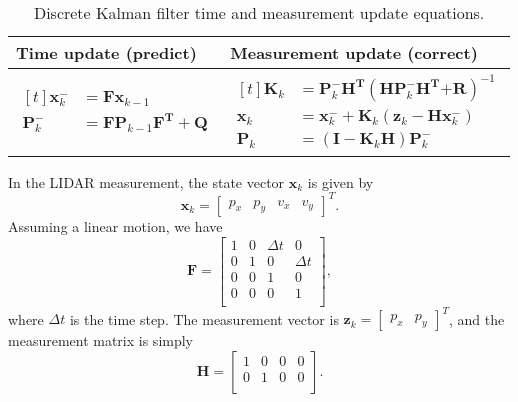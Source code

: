 \documentclass[12pt]{article}
\begin{document}
\begin{table}[h]
	\renewcommand{\arraystretch}{1.5}
	\caption{Discrete Kalman filter time and measurement update equations.}
	\centering
	\label{tab:table-KF}
	\begin{tabular}{C{7cm}|C{7cm}}
		\hline
		Time update (predict) & Measurement update (correct) \\
		\hline
		$\begin{aligned}[t]
			\mathbf{x}_{k}^{-} &= \mathbf{F}\mathbf{x}_{k - 1} \\
			\mathbf{P}_{k}^{-} &= \mathbf{F}\mathbf{P}_{k - 1}\mathbf{F}^{\mathbf{T}} + \mathbf{Q}
		\end{aligned}$ &
		$\begin{aligned}[t]
			\mathbf{K}_{k} &= \mathbf{P}_{k}^{-}\mathbf{H}^{\mathbf{T}}( \mathbf{H}\mathbf{P}_{k}^{-}\mathbf{H}^{\mathbf{T}}\mathbf{+ R})^{- 1} \\
			\mathbf{x}_{k} &= \mathbf{x}_{k}^{-} + \mathbf{K}_{k}( \mathbf{z}_{k} - \mathbf{H}\mathbf{x}_{k}^{-}) \\
			\mathbf{P}_{k} &= ( \mathbf{I} - \mathbf{K}_{k}\mathbf{H})\mathbf{P}_{k}^{-}
		\end{aligned}$ \\
		\hline
	\end{tabular}
\end{table}

In the LIDAR measurement, the state vector \(\mathbf{x}_{k}\) is given by
%
\begin{equation}
	\mathbf{x}_{k} = \begin{bmatrix} p_{x} & p_{y} & v_{x} & v_{y}\end{bmatrix}^{T}.
\end{equation}
%
Assuming a linear motion, we have
%
\begin{equation}
	\mathbf{F} = \begin{bmatrix}
	1 & 0 & \Delta t & 0 \\
	0 & 1 & 0 & \Delta t \\
	0 & 0 & 1 & 0 \\
	0 & 0 & 0 & 1 \\
	\end{bmatrix},
\end{equation}
%
where \(\Delta t\) is the time step. The measurement vector is \(\mathbf{z}_{k} = \begin{bmatrix} p_{x} & p_{y} \end{bmatrix}^{T}\), and the measurement matrix is simply
%
\begin{equation}
	\mathbf{H} = \begin{bmatrix}
	1 & 0 & 0 & 0 \\
	0 & 1 & 0 & 0 \\
	\end{bmatrix}.
\end{equation}
\end{document}
